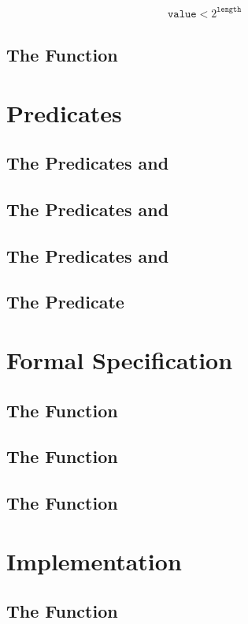 \begin{align}
\label{eq:bit-stream-write-pre}
    \mathtt{value} < 2^{\mathtt{length}}
\end{align}

\subsection{The Function }

\section{Predicates}
\subsection{The Predicates \readable and \writeable}
\subsection{The Predicates \invariant and \normal}
\subsection{The Predicates \equalbits and \unchanged}
\subsection{The Predicate \upperbitsnotset}

\section{Formal Specification}
\subsection{The Function \bitstreamread}
\subsection{The Function }
\subsection{The Function }

\section{Implementation}
\subsection{The Function \bitstreamread}
